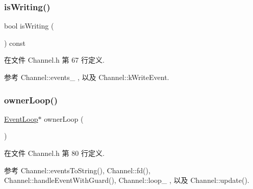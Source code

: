 \subsubsection{\texorpdfstring{is\+Writing()}{isWriting()}}
{\footnotesize\ttfamily bool is\+Writing (\begin{DoxyParamCaption}{ }\end{DoxyParamCaption}) const\hspace{0.3cm}{\ttfamily [inline]}}



在文件 Channel.\+h 第 67 行定义.



参考 Channel\+::events\+\_\+ , 以及 Channel\+::k\+Write\+Event.

\mbox{\label{classmuduo_1_1net_1_1Channel_a2e24e2ab7ada4682fdf49cc835d85e8d}} 
\subsubsection{\texorpdfstring{owner\+Loop()}{ownerLoop()}}
{\footnotesize\ttfamily \hyperlink{classmuduo_1_1net_1_1EventLoop}{Event\+Loop}$\ast$ owner\+Loop (\begin{DoxyParamCaption}{ }\end{DoxyParamCaption})\hspace{0.3cm}{\ttfamily [inline]}}



在文件 Channel.\+h 第 80 行定义.



参考 Channel\+::events\+To\+String(), Channel\+::fd(), Channel\+::handle\+Event\+With\+Guard(), Channel\+::loop\+\_\+ , 以及 Channel\+::update().

